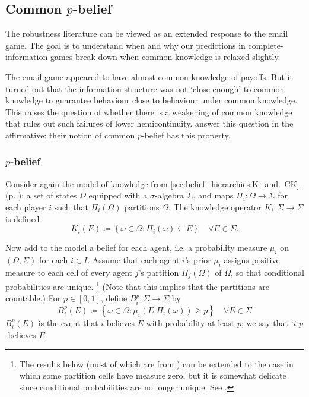 \documentclass[11pt,letterpaper,reqno,oneside]{article}
\begin{document}
\subsection{Common \texorpdfstring{$p$}{p}-belief}
\label{sec:robustness:common_p-belief}

The robustness literature can be viewed as an extended response to the email game. The goal is to understand when and why our predictions in complete-information games break down when common knowledge is relaxed slightly.

The email game appeared to have almost common knowledge of payoffs. But it turned out that the information structure was not `close enough' to common knowledge to guarantee behaviour close to behaviour under common knowledge. This raises the question of whether there is a weakening of common knowledge that rules out such failures of lower hemicontinuity. \textcite{MondererSamet1989} answer this question in the affirmative: their notion of common $p$-belief has this property.



\subsubsection{\texorpdfstring{$p$}{p}-belief}
\label{sec:robustness:common_p-belief:p_belief}

Consider again the model of knowledge from \cref{sec:belief_hierarchies:K_and_CK} (p. \pageref{sec:belief_hierarchies:K_and_CK}): a set of states $\Omega$ equipped with a $\sigma$-algebra $\Sigma$, and maps $\Pi_i : \Omega \to \Sigma$ for each player $i$ such that $\Pi_i(\Omega)$ partitions $\Omega$. The knowledge operator $K_i : \Sigma \to \Sigma$ is defined
%
\begin{equation*}
	K_i(E) \coloneqq \left\{ \omega \in \Omega : \Pi_i(\omega) \subseteq E \right\} 
	\quad \forall E \in \Sigma .
\end{equation*}


Now add to the model a belief for each agent, i.e. a probability measure $\mu_i$ on $(\Omega,\Sigma)$ for each $i \in I$. Assume that each agent $i$'s prior $\mu_i$ assigns positive measure to each cell of every agent $j$'s partition $\Pi_j(\Omega)$ of $\Omega$, so that conditional probabilities are unique.%
	\footnote{The results below (most of which are from \textcite{MondererSamet1989}) can be extended to the case in which some partition cells have measure zero, but it is somewhat delicate since conditional probabilities are no longer unique. See \textcite{KajiiMorris1997geb}.}
(Note that this implies that the partitions are countable.) For $p \in [0,1]$, define $B^p_i : \Sigma \to \Sigma$ by
%
\begin{equation*}
	B^p_i(E) \coloneqq \left\{ \omega \in \Omega : 
	\mu_i\left( E | \Pi_i(\omega) \right) \geq p \right\} 
	\quad \forall E \in \Sigma
\end{equation*}
%
$B^p_i(E)$ is the event that $i$ believes $E$ with probability at least $p$; we say that `$i$ $p$-believes $E$.
\end{document}
